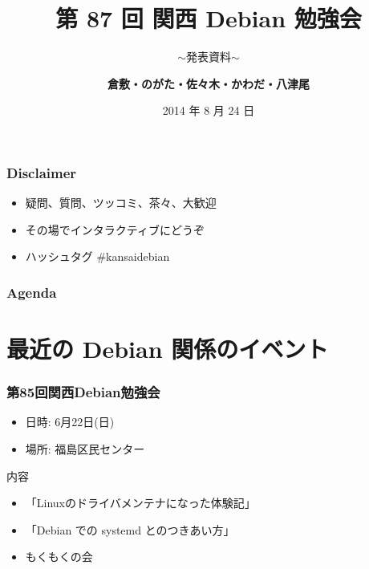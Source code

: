 \documentclass[cjk,dvipdfmx,10pt,compress,%
hyperref={bookmarks=true,bookmarksnumbered=true,bookmarksopen=false,%
colorlinks=false,%
pdftitle={第 87 回 関西 Debian 勉強会},%
pdfauthor={倉敷・のがた・佐々木・かわだ・八津尾},%
pdfsubject={資料},%
}]{beamer}
\title{第 87 回 関西 Debian 勉強会}
\subtitle{$\sim$発表資料$\sim$}
\author[かわだ てつたろう]{{\large\bf 倉敷・のがた・佐々木・かわだ・八津尾}}
\institute[Debian JP]{{\normalsize\tt 関西 Debian 勉強会}}
\date{{\small 2014 年 8 月 24 日}}
\begin{document}
\settitleslide
\begin{frame}
\titlepage
\end{frame}
\setdefaultslide

\begin{frame}[fragile]
  \frametitle{Disclaimer}
  \begin{itemize}
  \item 疑問、質問、ツッコミ、茶々、\alert{大歓迎}
  \item その場でインタラクティブにどうぞ
  \item ハッシュタグ \#kansaidebian
\end{itemize}
\end{frame}

\begin{frame}[fragile]
\frametitle{Agenda}

\tableofcontents

\end{frame}

\section{最近の Debian 関係のイベント}


\begin{frame}[fragile]
  \frametitle{第85回関西Debian勉強会}
  \begin{itemize}
  \item 日時: 6月22日(日)
  \item 場所: 福島区民センター
  \end{itemize}
  \begin{block}{内容}
    \begin{itemize}
    \item 「Linuxのドライバメンテナになった体験記」
    \item 「Debian での systemd とのつきあい方」
    \item もくもくの会
    \end{itemize}
  \end{block}
\end{frame}
\end{document}
